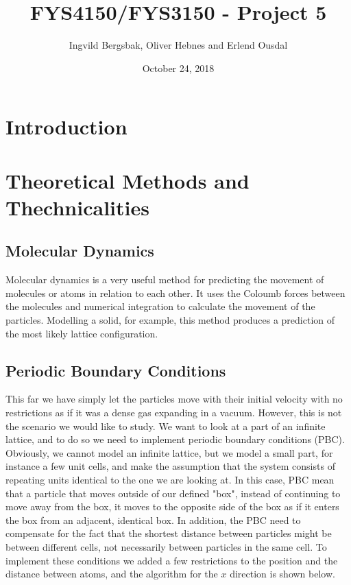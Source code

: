 \documentclass{article}
\begin{document}
\title{\textbf{FYS4150/FYS3150 - Project 5}}
\author{Ingvild Bergsbak, Oliver Hebnes and Erlend Ousdal}
\date{October 24, 2018}


\maketitle
\begin{abstract}
\end{abstract}
\section{Introduction}




\section{Theoretical Methods and Thechnicalities}
\subsection{Molecular Dynamics}
Molecular dynamics is a very useful method for predicting the movement of molecules or atoms in relation to each other. It uses the Coloumb forces between the molecules and numerical integration to calculate the movement of the particles. Modelling a solid, for example, this method produces a prediction of the most likely lattice configuration. 

\subsection{Periodic Boundary Conditions}
This far we have simply let the particles move with their initial velocity with no restrictions as if it was a dense gas expanding in a vacuum. However, this is not the scenario we would like to study. We want to look at a part of an infinite lattice, and to do so we need to implement periodic boundary conditions (PBC). Obviously, we cannot model an infinite lattice, but we model a small part, for instance a few unit cells, and make the assumption that the system consists of repeating units identical to the one we are looking at. In this case, PBC mean that a particle that moves outside of our defined "box", instead of continuing to move away from the box, it moves to the opposite side of the box as if it enters the box from an adjacent, identical box. In addition, the PBC need to compensate for the fact that the shortest distance between particles might be between different cells, not necessarily between particles in the same cell. To implement these conditions we added a few restrictions to the position and the distance between atoms, and the algorithm for the $x$ direction is shown below.
\end{document}
